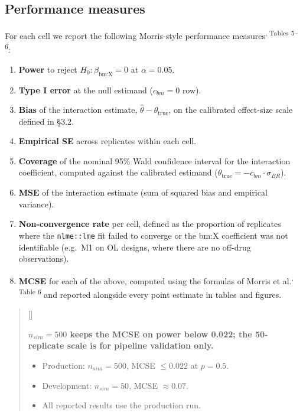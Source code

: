 \documentclass[
  11pt,
]{article}
\providecommand{\tightlist}{%
  \setlength{\itemsep}{0pt}\setlength{\parskip}{0pt}}
\newcounter{pgraph}
\newenvironment{bullets}{%
  \stepcounter{pgraph}%
  \begin{quote}\small\sffamily\color[gray]{0.30}%
  {\normalfont\scriptsize\color[gray]{0.58}[\thepgraph]\enspace}}{%
  \end{quote}}
\begin{document}
\subsection{Performance measures}\label{performance-measures}

For each cell we report the following Morris-style performance
measures\textsuperscript{, Tables 5--6}:

\begin{enumerate}
\def\labelenumi{\arabic{enumi}.}
\tightlist
\item
  \textbf{Power} to reject \(H_0: \beta_{\text{bm:X}} = 0\) at
  \(\alpha = 0.05\).
\item
  \textbf{Type I error} at the null estimand (\(c_{bm} = 0\) row).
\item
  \textbf{Bias} of the interaction estimate, \(\hat{\theta} -
  \theta_{\text{true}}\), on the calibrated effect-size scale
  defined in §3.2.
\item
  \textbf{Empirical SE} across replicates within each cell.
\item
  \textbf{Coverage} of the nominal 95\% Wald confidence interval for
  the interaction coefficient, computed against the calibrated
  estimand
  (\(\theta_{\text{true}} = -c_{bm} \cdot \sigma_{BR}\)).
\item
  \textbf{MSE} of the interaction estimate (sum of squared bias and
  empirical variance).
\item
  \textbf{Non-convergence rate} per cell, defined as the proportion
  of replicates where the \texttt{nlme::lme} fit failed to converge or
  the bm:X coefficient was not identifiable (e.g.~M1 on OL
  designs, where there are no off-drug observations).
\item
  \textbf{MCSE} for each of the above, computed using the
  formulas of Morris et al.\textsuperscript{, Table 6}
  and reported alongside every point estimate in tables and
  figures.
\end{enumerate}

\begin{bullets}

\textbf{$n_{sim} = 500$ keeps the MCSE on power below 0.022; the
50-replicate scale is for pipeline validation only.}

\begin{itemize}\setlength{\itemsep}{2pt}\setlength{\parskip}{0pt}
\item Production: $n_{sim} = 500$, MCSE $\leq 0.022$ at $p = 0.5$.
\item Development: $n_{sim} = 50$, MCSE $\approx 0.07$.
\item All reported results use the production run.
\end{itemize}

\end{bullets}
\end{document}
